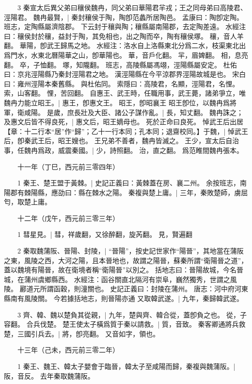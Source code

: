 　　3 秦宣太后異父弟曰穰侯魏冉，同父弟曰華陽君羋戎；王之同母弟曰高陵君、涇陽君。
	魏冉最賢，|{
	秦封穰侯于陶，陶卽范蠡所居陶邑。
	孟康曰：陶卽定陶。
	班志，定陶縣屬濟陰郡。
	下云封于穰與陶；穰縣屬南陽郡，去定陶差遠。
	水經注曰：穰侯封於穰，益封于陶，其免相也，出之陶而卒，陶有穰侯塚。
	穰，音人羊翻。
	華陽，卽武王歸馬之地。
	水經注：洛水自上洛縣東北分爲二水，枝渠東北出爲門水，水東北曆陽華之山，卽華陽也。
	華，音戶化翻。
	羋，眉婢翻。
	相，息亮翻。
	卒，子恤翻。
	塚，知隴翻。
	班志，高陵縣屬馮翊，涇陽縣屬安定。
	杜佑曰：京兆涇陽縣乃秦封涇陽君之地。
	漢涇陽縣在今平涼郡界涇陽故城是也。
	宋白曰：雍州涇陽本秦舊縣。
	與杜佑同。
	索隱曰：高陵君，名顯，涇陽君，名悝。
	索，山客翻。
	悝，苦回翻。
}
自惠王、武王時，任職用事，武王薨，諸弟爭立，唯魏冉力能立昭王。|{
	惠王，卽惠文王。
	昭王，卽昭襄王
	}
昭王卽位，以魏冉爲將軍，衛咸陽。
	是歲，庶長壯及大臣、諸公子謀作亂。|{
	長，知丈翻。
}
魏冉誅之；及惠文后皆不得良死，|{
	惠文后，昭王嫡母也。
	死於正命曰良死。
}
悼武王后出居【章：十二行本“居”作“歸”；乙十一行本同；孔本同；退齋校同。】于魏，|{
	悼武王后，卽秦武王后，昭王嫂也。
}
王兄弟不善者，魏冉皆滅之。
	王少，宣太后自治事，任魏冉爲政，威震秦國。|{
	少，詩照翻。
	治，直之翻。
	爲范睢間魏冉張本。
}

　　十一年（丁巳，西元前三零四年）

　　1 秦王、楚王盟于黃棘。|{
	史記正義曰：黃棘蓋在房、襄二州。
	余按班志，南陽郡有棘陽縣，應劭曰：縣在棘水之陽。
}
秦複與楚上庸。|{
	三年，秦敗楚師，虜屈匄，取楚上庸。
}

　　十二年（戊午，西元前三零三年）

　　1 彗星見。|{
	彗，祥歲翻，又徐醉翻，旋芮翻。
	見，賢遍翻
	}

　　2 秦取魏蒲阪、晉陽、封陵，|{
	“晉陽”，按史記世家作“陽晉”，其地當在蒲阪之東，風陵之西，大河之陽，且本晉地也，故謂之陽晉，蘇秦所謂“衛陽晉之道”，蓋以魏境有陽晉，故在衛境者稱“衛陽晉”以別之。
	括地志曰：晉陽故城，今名晉城，在蒲州虞鄉縣西。
	水經注：函谷關直北隔河有崇阜，巍然獨秀，世謂之風陵。
	酈道元所謂函穀，則潼關也。
	史記正義曰：封陵在蒲州。
	唐志：河中府河東縣南有風陵關。
	今若據括地志，則晉陽亦通
	}
又取韓武遂。|{
	九年，秦歸韓武遂。
}

　　3 齊、韓、魏以楚負其從親，|{
	九年，楚與齊、韓合從，蓋卽負之也。
	從，子容翻。
}
合兵伐楚。
	楚王使太子橫爲質于秦以請救。|{
	質，音致。
}
秦客卿通將兵救楚，三國引兵去。|{
	將，卽亮翻。
	又音如字，領也。
}

　　十三年（己未，西元前三零二年）

　　1 秦王、魏王、韓太子嬰會于臨晉，韓太子至咸陽而歸，秦複與魏蒲阪。|{
	阪，音反。
	去年秦取魏蒲阪。
}

